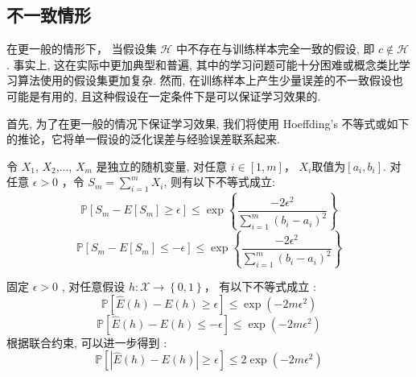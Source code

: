 \subsection{不一致情形}
在更一般的情形下， 当假设集 $\mathcal{H}$ 中不存在与训练样本完全一致的假设, 即 $c \notin \mathcal{H}$.  事实上, 这在实际中更加典型和普遍, 其中的学习问题可能十分困难或概念类比学习算法使用的假设集更加复杂.  然而,  在训练样本上产生少量误差的不一致假设也可能是有用的, 且这种假设在一定条件下是可以保证学习效果的.\par
首先, 为了在更一般的情况下保证学习效果, 我们将使用 Hoeffding's 不等式或如下的推论，它将单一假设的泛化误差与经验误差联系起来. \\
\begin{theorem}\label{thm:Hoeffding}
令 $X_1$, $X_2$,..., $X_m$ 是独立的随机变量, 对任意 $i \in [1,m]$， $X_i$取值为$[a_i,b_i]$. 对任意 $\epsilon>0$ ，令 $S_m=\sum_{i=1}^m{X_i}$, 则有以下不等式成立:
\begin{equation}
\mathbb{P}\left[ S_m-E\left[ S_m \right] \ge \epsilon \right] \le \exp \left\{ \frac{-2\epsilon ^2}{\sum\limits_{i=1}^m{\left( b_i-a_i \right) ^2}} \right\}
\end{equation}
\begin{equation}
\mathbb{P}\left[ S_m-E\left[ S_m \right] \le -\epsilon \right] \le \exp \left\{ \frac{-2\epsilon ^2}{\sum\limits_{i=1}^m{\left( b_i-a_i \right) ^2}} \right\}
\end{equation}
\end{theorem}


\begin{lemma}\label{lem:1}
固定 $\epsilon>0$ , 对任意假设 $h:\mathcal{X}\rightarrow \left\{ 0,1 \right\} $， 有以下不等式成立 :
\begin{equation}
\mathbb{P}\left[ \hat{E}\left( h \right) -E\left( h \right) \ge \epsilon \right] \le \exp \left( -2m\epsilon ^2 \right)
\end{equation}
\begin{equation}
\mathbb{P}\left[ \hat{E}\left( h \right) -E\left( h \right) \le -\epsilon \right] \le \exp \left( -2m\epsilon ^2 \right)
\end{equation}
根据联合约束, 可以进一步得到 :
\begin{equation}
\mathbb{P}\left[ \left| \hat{E}\left( h \right) -E\left( h \right) \right|\ge \epsilon \right] \le 2\exp \left( -2m\epsilon ^2 \right)
\end{equation}
\end{lemma}

